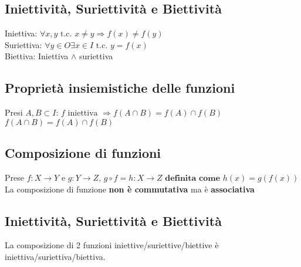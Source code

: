 \documentclass{report}
\begin{document}
    \subsection{Iniettività, Suriettività e Biettività}
        Iniettiva: $\forall x,y \textrm{ t.c. } x \neq y \Longrightarrow f\left(x\right) \neq f\left(y\right)$ \\
        Suriettiva: $\forall y \in O \exists x \in I \textrm{ t.c. } y = f\left(x\right)$ \\
        Biettiva: Iniettiva $\wedge$ suriettiva
    \subsection{Proprietà insiemistiche delle funzioni}
        Presi $A,B \subset I$:
        $f \textrm{ iniettiva } \Longrightarrow f\left(A \cap B\right) = f\left(A\right) \cap f\left(B\right)$
        $f\left(A \cap B\right) = f\left(A\right) \cap f\left(B\right)$
    \subsection{Composizione di funzioni}
        Prese $f: X \longrightarrow Y$ e $g: Y \longrightarrow Z, \, g \circ f = 
        h: X \longrightarrow Z \textbf{ definita come } h\left(x\right) = g\left(f\left(x\right)\right)$ \\
        La composizione di funzione \textbf{non è commutativa} ma è \textbf{associativa} \\
        \subsection{Iniettività, Suriettività e Biettività}
            La composizione di 2 funzioni iniettive/suriettive/biettive è iniettiva/suriettiva/biettiva.
\end{document}
